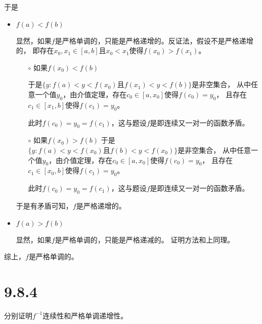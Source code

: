 \documentclass{article}
\begin{document}
于是
\begin{itemize}
      \item $f(a) < f(b)$

            显然，如果$f$是严格单调的，只能是严格递增的。反证法，假设不是严格递增的，
            即存在$x_0, x_1 \in [a,b]$且$x_0 < x_1$使得$f(x_0) > f(x_1)$。

            \begin{itemize}
                  \item[$\circ$]如果$f(x_0) < f(b)$

                        于是$\{y : f(a) < y < f(x_0) \text{且} f(x_1) < y < f(b) \}$是非空集合，
                        从中任意一个值$y_0$，由介值定理，存在$c_0 \in [a, x_0]$使得$f(c_0) = y_0$，
                        且存在$c_1 \in [x_1, b]$使得$f(c_1) = y_0$。

                        此时$f(c_0) = y_0 = f(c_1)$，这与题设$f$是即连续又一对一的函数矛盾。

                  \item[$\circ$]如果$f(x_0) > f(b)$
                        于是$\{y : f(a) < y < f(x_0) \text{且} f(b) < y < f(x_0) \}$是非空集合，
                        从中任意一个值$y_0$，由介值定理，存在$c_0 \in [a, x_0]$使得$f(c_0) = y_0$，
                        且存在$c_1 \in [x_0, b]$使得$f(c_1) = y_0$。

                        此时$f(c_0) = y_0 = f(c_1)$，这与题设$f$是即连续又一对一的函数矛盾。
            \end{itemize}

            于是有矛盾可知，$f$是严格递增的。

      \item $f(a) > f(b)$

            显然，如果$f$是严格单调的，只能是严格递减的。
            证明方法和上同理。
\end{itemize}

综上，$f$是严格单调的。

\section*{9.8.4}

分别证明$f^{-1}$连续性和严格单调递增性。
\end{document}
